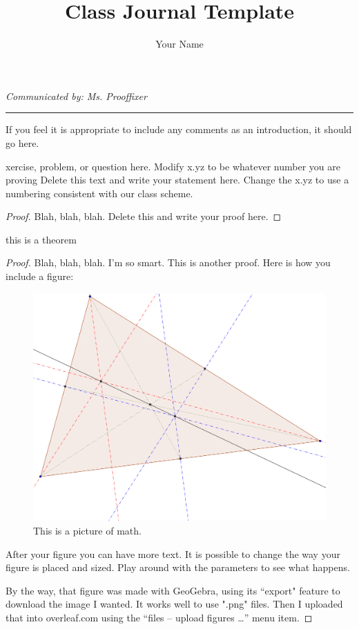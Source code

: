 \documentclass[12pt]{article}
\newenvironment{theorem}[2][Theorem]{\begin{trivlist}
\item[\hskip \labelsep {\bfseries #1}\hskip \labelsep {\bfseries #2.}]}{\end{trivlist}}
\newenvironment{lemma}[2][Lemma]{\begin{trivlist}
\item[\hskip \labelsep {\bfseries #1}\hskip \labelsep {\bfseries #2.}]}{\end{trivlist}}
\begin{document}
 
 
\title{Class Journal Template} %
\author{Your Name} %
 
\maketitle

{%
\centering
\textit{Communicated by: Ms. Prooffixer} %
\par
}
\hrule
\vspace{.2in}


If you feel it is appropriate to include any comments as an introduction, it should go here.

\begin{lemma}{x.yz} %
xercise, problem, or question here.  Modify x.yz to be whatever number you are proving
Delete this text and write your statement here. Change the x.yz to use a numbering consistent with our class scheme.
\end{lemma}
 
\begin{proof}  
Blah, blah, blah. Delete this and write your proof here.
\end{proof}
 
\begin{theorem}{x.yz}
this is a theorem
\end{theorem}
 
\begin{proof}
Blah, blah, blah.  I'm so smart. This is another proof. Here is how you include a figure:

\begin{figure}[ht]
\centering
\includegraphics[width=.5\textwidth]{TEG_cover.png}
\caption{This is a picture of math.}
\end{figure}


After your figure you can have more text. It is possible to change the way your figure is placed and sized. Play around with the parameters to see what happens.

By the way, that figure was made with GeoGebra, using its ``export" feature to download the image I wanted. It works well to use ".png" files. Then I uploaded that into overleaf.com using the ``files -- upload figures \dots'' menu item.
\end{proof}
 
 
\end{document}
